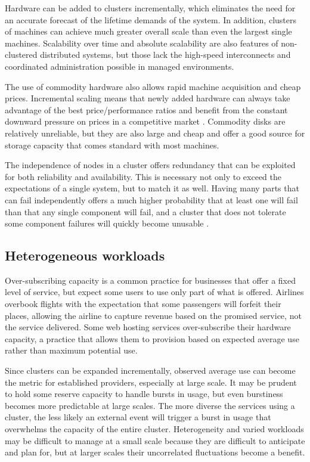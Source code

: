 Hardware can be added to clusters incrementally, which eliminates the need for an accurate forecast of the lifetime demands of the system. In addition, clusters of machines can achieve much greater overall scale than even the largest single machines. Scalability over time and absolute scalability are also features of non-clustered distributed systems, but those lack the high-speed interconnects and coordinated administration possible in managed environments.

The use of commodity hardware also allows rapid machine acquisition and cheap prices. Incremental scaling means that newly added hardware can always take advantage of the best price/performance ratios and benefit from the constant downward pressure on prices in a competitive market \cite{fox}. Commodity disks are relatively unreliable, but they are also large and cheap and offer a good source for storage capacity \cite{patterson,warfield} that comes standard with most machines.

The independence of nodes in a cluster offers redundancy that can be exploited for both reliability and availability. This is necessary not only to exceed the expectations of a single system, but to match it as well. Having many parts that can fail independently offers a much higher probability that at least one will fail than that any single component will fail, and a cluster that does not tolerate some component failures will quickly become unusable \cite{birrell93}.

\subsection{Heterogeneous workloads}

Over-subscribing capacity is a common practice for businesses that offer a fixed level of service, but expect some users to use only part of what is offered. Airlines overbook flights with the expectation that some passengers will forfeit their places, allowing the airline to capture revenue based on the promised service, not the service delivered. Some web hosting services over-subscribe their hardware capacity, a practice that allows them to provision based on expected average use rather than maximum potential use.

Since clusters can be expanded incrementally, observed average use can become the metric for established providers, especially at large scale. It may be prudent to hold some reserve capacity to handle bursts in usage, but even burstiness becomes more predictable at large scales. The more diverse the services using a cluster, the less likely an external event will trigger a burst in usage that overwhelms the capacity of the entire cluster. Heterogeneity and varied workloads may be difficult to manage at a small scale because they are difficult to anticipate and plan for, but at larger scales their uncorrelated fluctuations become a benefit.

